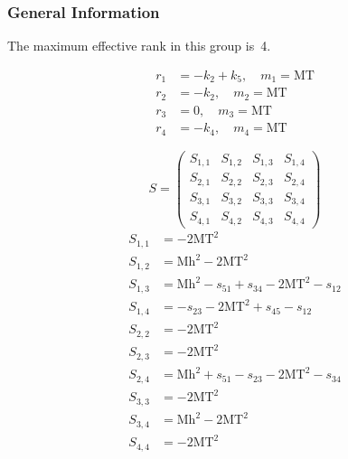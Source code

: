 \documentclass[a4paper]{article}
\begin{document}
\subsubsection*{General Information}
The maximum effective rank in this group is~4.

\begin{subequations}
\begin{align}
r_{1} &= -k_{2}+k_{5},\quad m_{1} = \text{MT}\\
r_{2} &= -k_{2},\quad m_{2} = \text{MT}\\
r_{3} &= 0,\quad m_{3} = \text{MT}\\
r_{4} &= -k_{4},\quad m_{4} = \text{MT}
\end{align}
\end{subequations}

\begin{equation}
S=\left(\begin{array}{cccc}
   S_{1,1}&
   S_{1,2}&
   S_{1,3}&
   S_{1,4}\\
   S_{2,1}&
   S_{2,2}&
   S_{2,3}&
   S_{2,4}\\
   S_{3,1}&
   S_{3,2}&
   S_{3,3}&
   S_{3,4}\\
   S_{4,1}&
   S_{4,2}&
   S_{4,3}&
   S_{4,4}\end{array}\right)
\end{equation}
\begin{subequations}
\begin{align}
   S_{1,1}&=-2\text{MT}^2\\
   S_{1,2}&=\text{Mh}^2-2\text{MT}^2\\
   S_{1,3}&=\text{Mh}^2-s_{51}+s_{34}-2\text{MT}^2-s_{12}\\
   S_{1,4}&=-s_{23}-2\text{MT}^2+s_{45}-s_{12}\\
   S_{2,2}&=-2\text{MT}^2\\
   S_{2,3}&=-2\text{MT}^2\\
   S_{2,4}&=\text{Mh}^2+s_{51}-s_{23}-2\text{MT}^2-s_{34}\\
   S_{3,3}&=-2\text{MT}^2\\
   S_{3,4}&=\text{Mh}^2-2\text{MT}^2\\
   S_{4,4}&=-2\text{MT}^2
\end{align}
\end{subequations}
\end{document}
